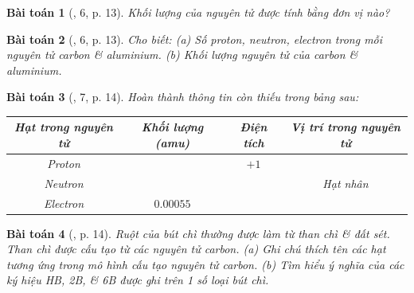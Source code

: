 \documentclass{article}
\newtheorem{baitoan}{Bài toán}
\begin{document}
\begin{baitoan}[\cite{SGK_KHTN_7_Canh_Dieu}, 6, p. 13]
	Khối lượng của nguyên tử được tính bằng đơn vị nào?
\end{baitoan}

\begin{baitoan}[\cite{SGK_KHTN_7_Canh_Dieu}, 6, p. 13]
	Cho biết: (a) Số proton, neutron, electron trong mỗi nguyên tử carbon \& aluminium. (b) Khối lượng nguyên tử của carbon \& aluminium.
\end{baitoan}

\begin{baitoan}[\cite{SGK_KHTN_7_Canh_Dieu}, 7, p. 14]
	Hoàn thành thông tin còn thiếu trong bảng sau:
	\begin{table}[H]
		\centering
		\begin{tabular}{|c|c|c|c|}
			\hline
			Hạt trong nguyên tử & Khối lượng (amu) & Điện tích & Vị trí trong nguyên tử \\
			\hline
			Proton &  & $+1$ &  \\
			\hline
			Neutron &  &  & Hạt nhân \\
			\hline
			Electron & $0.00055$ &  &  \\
			\hline
		\end{tabular}
	\end{table}
\end{baitoan}

\begin{baitoan}[\cite{SGK_KHTN_7_Canh_Dieu}, p. 14]
	Ruột của bút chì thường được làm từ than chì \& đất sét. Than chì được cấu tạo từ các nguyên tử carbon. (a) Ghi chú thích tên các hạt tương ứng trong mô hình cấu tạo nguyên tử carbon. (b) Tìm hiểu ý nghĩa của các ký hiệu HB, 2B, \& 6B được ghi trên 1 số loại bút chì.
\end{baitoan}
\noindent{}
\end{document}
